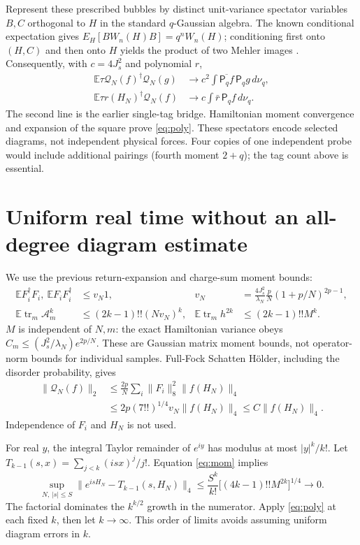 \documentclass[11pt,a4paper]{article}
\newcommand{\EE}{\mathbb E}
\newcommand{\tr}{\operatorname{tr}}
\newcommand{\Mq}{\mathsf P_q}
\begin{document}
Represent these prescribed bubbles by distinct unit-variance spectator
variables $B,C$ orthogonal to $H$ in the standard $q$-Gaussian algebra.
The known conditional expectation gives
$E_H[BW_n(H)B]=q^nW_n(H)$; conditioning first onto $(H,C)$ and then
onto $H$ yields the product of two Mehler images \cite{BKS,BINT}.
Consequently, with $c=4J_s^2$ and polynomial $r$,
\begin{align}
 \EE\tau\mathcal Q_N(f)^\dagger\mathcal Q_N(g)
 &\longrightarrow c^2\int\overline{\Mq f}\,\Mq g\,d\nu_q,\\
 \EE\tau r(H_N)^\dagger\mathcal Q_N(f)
 &\longrightarrow c\int\bar r\,\Mq f\,d\nu_q.
\end{align}
The second line is the earlier single-tag bridge. Hamiltonian moment
convergence and expansion of the square prove \eqref{eq:poly}.
These spectators encode selected diagrams, not independent physical
forces. Four copies of one independent probe would include additional
pairings (fourth moment $2+q$); the tag count above is essential.

\newpage
\section{Uniform real time without an all-degree diagram estimate}
We use the previous return-expansion and charge-sum moment bounds:
\begin{align}
 \EE F_i^\dagger F_i,\ \EE F_iF_i^\dagger&\le v_N1,&
 v_N&=\frac{4J_s^2}{\lambda_N}\frac pN(1+p/N)^{2p-1},\\
 \EE\tr_m\mathcal A_m^k&\le(2k-1)!!(Nv_N)^k,&
 \EE\tr_m h^{2k}&\le(2k-1)!!M^k.\label{eq:mom}
\end{align}
$M$ is independent of $N,m$: the exact Hamiltonian variance obeys
$C_m\le (J_s^2/\lambda_N)e^{2p/N}$. These are Gaussian matrix
moment bounds, not operator-norm bounds for individual samples.
Full-Fock Schatten H\"older, including the disorder probability, gives
\begin{align}
 \|\mathcal Q_N(f)\|_2
 &\le\frac{2p}{N}\sum_i\|F_i\|_8^2\|f(H_N)\|_4\\
 &\le 2p(7!!)^{1/4}v_N\|f(H_N)\|_4
 \le C\|f(H_N)\|_4.\label{eq:map}
\end{align}
Independence of $F_i$ and $H_N$ is not used.

For real $y$, the integral Taylor remainder of $e^{iy}$ has modulus
at most $|y|^k/k!$. Let $T_{k-1}(s,x)=\sum_{j<k}(isx)^j/j!$.
Equation \eqref{eq:mom} implies
\begin{equation}
 \sup_{N,\,|s|\le S}
 \|e^{isH_N}-T_{k-1}(s,H_N)\|_4
 \le \frac{S^k}{k!}\big[(4k-1)!!M^{2k}\big]^{1/4}
 \longrightarrow0.\label{eq:taylor}
\end{equation}
The factorial dominates the $k^{k/2}$ growth in the numerator.
Apply \eqref{eq:poly} at each fixed $k$, then let $k\to\infty$.
This order of limits avoids assuming uniform diagram errors in $k$.
\end{document}
